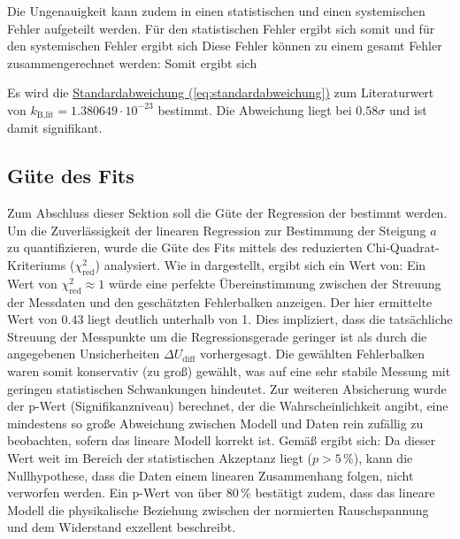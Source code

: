 Die Ungenauigkeit kann zudem in einen statistischen und einen systemischen Fehler aufgeteilt werden. 
Für den statistischen Fehler ergibt sich somit
und für den systemischen Fehler ergibt sich
Diese Fehler können zu einem gesamt Fehler zusammengerechnet werden:
Somit ergibt sich

Es wird die \hyperref[eq:standardabweichung]{Standardabweichung (\ref*{eq:standardabweichung})} zum Literaturwert von $k_\text{B,lit}= 1.380649 \cdot 10^{-23}$ bestimmt. Die Abweichung liegt bei $0.58\sigma$ und ist damit signifikant.

\subsection{Güte des Fits}
Zum Abschluss dieser Sektion soll die Güte der Regression der  bestimmt werden. 
Um die Zuverlässigkeit der linearen Regression zur Bestimmung der Steigung $a$ zu quantifizieren, wurde die Güte des Fits mittels des reduzierten Chi-Quadrat-Kriteriums ($\chi^2_\text{red}$) analysiert. Wie in  dargestellt, ergibt sich ein Wert von:
Ein Wert von $\chi^2_\text{red} \approx 1$ würde eine perfekte Übereinstimmung zwischen der Streuung der Messdaten und den geschätzten Fehlerbalken anzeigen. Der hier ermittelte Wert von $0.43$ liegt deutlich unterhalb von 1. Dies impliziert, dass die tatsächliche Streuung der Messpunkte um die Regressionsgerade geringer ist als durch die angegebenen Unsicherheiten $\Delta {U_\text{diff}}$ vorhergesagt. Die gewählten Fehlerbalken waren somit konservativ (zu groß) gewählt, was auf eine sehr stabile Messung mit geringen statistischen Schwankungen hindeutet.
Zur weiteren Absicherung wurde der p-Wert (Signifikanzniveau) berechnet, der die Wahrscheinlichkeit angibt, eine mindestens so große Abweichung zwischen Modell und Daten rein zufällig zu beobachten, sofern das lineare Modell korrekt ist. Gemäß  ergibt sich:
Da dieser Wert weit im Bereich der statistischen Akzeptanz liegt ($p > 5\,\%$), kann die Nullhypothese, dass die Daten einem linearen Zusammenhang folgen, nicht verworfen werden. Ein p-Wert von über 80\,\% bestätigt zudem, dass das lineare Modell die physikalische Beziehung zwischen der normierten Rauschspannung und dem Widerstand exzellent beschreibt. 

